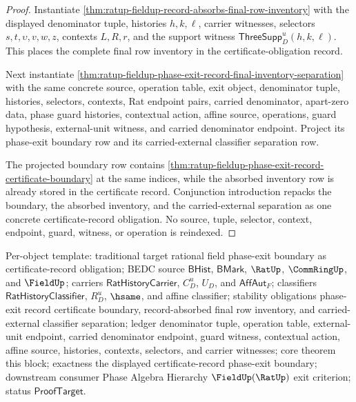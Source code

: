 \begin{proof}
Instantiate
\autoref{thm:ratup-fieldup-record-absorbs-final-row-inventory} with the
displayed denominator tuple, histories $h,k,\ell$, carrier witnesses, selectors
$s,t,\upsilon,v,w,z$, contexts $L,R,r$, and the support witness
$\mathsf{ThreeSupp}_D^u(h,k,\ell)$. This places the complete final row
inventory in the certificate-obligation record.

Next instantiate
\autoref{thm:ratup-fieldup-phase-exit-record-final-inventory-separation} with
the same concrete source, operation table, exit object, denominator tuple,
histories, selectors, contexts, Rat endpoint pairs, carried denominator,
apart-zero data, phase guard histories, contextual action, affine source,
operations, guard hypothesis, external-unit witness, and carried denominator
endpoint. Project its phase-exit boundary row and its carried-external
classifier separation row.

The projected boundary row contains
\autoref{thm:ratup-fieldup-phase-exit-record-certificate-boundary} at the same
indices, while the absorbed inventory row is already stored in the certificate
record. Conjunction introduction repacks the boundary, the absorbed inventory,
and the carried-external separation as one concrete certificate-record
obligation. No source, tuple, selector, context, endpoint, guard, witness, or
operation is reindexed.
\end{proof}

Per-object template: traditional target rational field phase-exit boundary as
certificate-record obligation; BEDC source $\mathsf{BHist}$, $\mathsf{BMark}$,
$\RatUp$, $\CommRingUp$, and $\FieldUp$; carriers
$\mathsf{RatHistoryCarrier}$, $C_D^u$, $U_D$, and $\mathsf{AffAut}_F$;
classifiers $\mathsf{RatHistoryClassifier}$, $R_D^u$, $\hsame$, and affine
classifier; stability obligations phase-exit record certificate boundary,
record-absorbed final row inventory, and carried-external classifier
separation; ledger denominator tuple, operation table, external-unit endpoint,
carried denominator endpoint, guard witness, contextual action, affine source,
histories, contexts, selectors, and carrier witnesses; core theorem this
block; exactness the displayed certificate-record phase-exit boundary;
downstream consumer Phase Algebra Hierarchy $\FieldUp(\RatUp)$ exit criterion;
status $\mathsf{ProofTarget}$.

